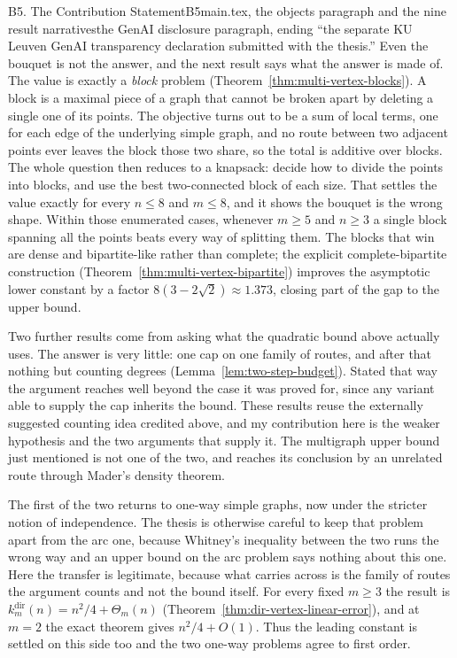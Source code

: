 \begin{offcutrewrite}{B5. The Contribution Statement}{B5}{main.tex, the objects paragraph and the nine result narratives}{the GenAI disclosure paragraph, ending ``the separate KU Leuven GenAI transparency declaration submitted with the thesis.''}
Even the bouquet is not the answer, and the next result says what the answer is made of. The value is exactly a \emph{block} problem (Theorem~\ref{thm:multi-vertex-blocks}). A block is a maximal piece of a graph that cannot be broken apart by deleting a single one of its points. The objective turns out to be a sum of local terms, one for each edge of the underlying simple graph, and no route between two adjacent points ever leaves the block those two share, so the total is additive over blocks. The whole question then reduces to a knapsack: decide how to divide the points into blocks, and use the best two-connected block of each size. That settles the value exactly for every $n \le 8$ and $m \le 8$, and it shows the bouquet is the wrong shape. Within those enumerated cases, whenever $m\ge5$ and $n\ge3$ a single block spanning all the points beats every way of splitting them. The blocks that win are dense and bipartite-like rather than complete; the explicit complete-bipartite construction (Theorem~\ref{thm:multi-vertex-bipartite}) improves the asymptotic lower constant by a factor $8(3-2\sqrt2) \approx 1.373$, closing part of the gap to the upper bound.

Two further results come from asking what the quadratic bound above actually uses. The answer is very little: one cap on one family of routes, and after that nothing but counting degrees (Lemma~\ref{lem:two-step-budget}). Stated that way the argument reaches well beyond the case it was proved for, since any variant able to supply the cap inherits the bound. These results reuse the externally suggested counting idea credited above, and my contribution here is the weaker hypothesis and the two arguments that supply it. The multigraph upper bound just mentioned is not one of the two, and reaches its conclusion by an unrelated route through Mader's density theorem.

The first of the two returns to one-way simple graphs, now under the stricter notion of independence. The thesis is otherwise careful to keep that problem apart from the arc one, because Whitney's inequality between the two runs the wrong way and an upper bound on the arc problem says nothing about this one. Here the transfer is legitimate, because what carries across is the family of routes the argument counts and not the bound itself. For every fixed $m\ge3$ the result is $k_m^{\mathrm{dir}}(n) = n^2/4 + \Theta_m(n)$ (Theorem~\ref{thm:dir-vertex-linear-error}), and at $m=2$ the exact theorem gives $n^2/4+O(1)$. Thus the leading constant is settled on this side too and the two one-way problems agree to first order.


\end{offcutrewrite}
